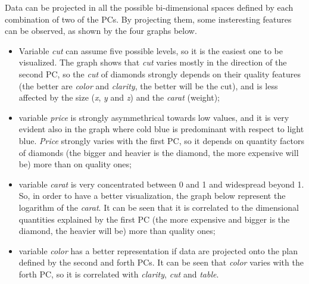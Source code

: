 \documentclass[
]{article}
\providecommand{\tightlist}{%
  \setlength{\itemsep}{0pt}\setlength{\parskip}{0pt}}
\begin{document}
Data can be projected in all the possible bi-dimensional spaces defined
by each combination of two of the PCs. By projecting them, some
insteresting features can be observed, as shown by the four graphs
below.

\begin{itemize}
\tightlist
\item
  Variable \emph{cut} can assume five possible levels, so it is the
  easiest one to be visualized. The graph shows that \emph{cut} varies
  mostly in the direction of the second PC, so the \emph{cut} of
  diamonds strongly depends on their quality features (the better are
  \emph{color} and \emph{clarity}, the better will be the cut), and is
  less affected by the size (\emph{x}, \emph{y} and \emph{z}) and the
  \emph{carat} (weight);
\item
  variable \emph{price} is strongly asymmethrical towards low values,
  and it is very evident also in the graph where cold blue is
  predominant with respect to light blue. \emph{Price} strongly varies
  with the first PC, so it depends on quantity factors of diamonds (the
  bigger and heavier is the diamond, the more expensive will be) more
  than on quality ones;
\item
  variable \emph{carat} is very concentrated between 0 and 1 and
  widespread beyond 1. So, in order to have a better visualization, the
  graph below represent the logarithm of the \emph{carat}. It can be
  seen that it is correlated to the dimensional quantities explained by
  the first PC (the more expensive and bigger is the diamond, the
  heavier will be) more than quality ones;
\item
  variable \emph{color} has a better representation if data are
  projected onto the plan defined by the second and forth PCs. It can be
  seen that \emph{color} varies with the forth PC, so it is correlated
  with \emph{clarity}, \emph{cut} and \emph{table}.
\end{itemize}
\end{document}
